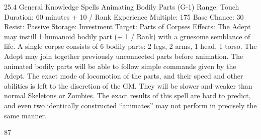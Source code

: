 \documentclass[a4paper]{article}
\begin{document}
\begin{multicols}{3}
25.4 General Knowledge Spells
Animating Bodily Parts (G-1)
Range: Touch
Duration: 60 minutes + 10 / Rank
Experience Multiple: 175
Base Chance: 30%
Resist: Passive
Storage: Investment
Target: Parts of Corpses
Effects: The Adept may instill 1 humanoid bodily
part (+ 1 / Rank) with a gruesome semblance of
life. A single corpse consists of 6 bodily parts: 2
legs, 2 arms, 1 head, 1 torso. The Adept may join
together previously unconnected parts before animation. The animated bodily parts will be able to
follow simple commands given by the Adept. The
exact mode of locomotion of the parts, and their
speed and other abilities is left to the discretion of
the GM. They will be slower and weaker than
normal Skeletons or Zombies. The exact results of
this spell are hard to predict, and even two identically constructed “animates” may not perform in
precisely the same manner.

87


\end{multicols}
\end{document}
